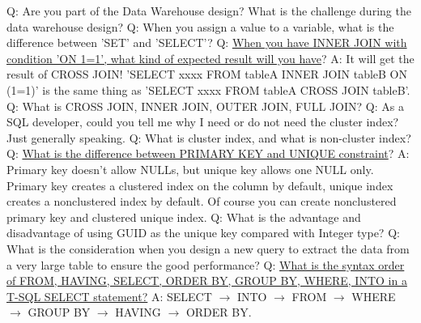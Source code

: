 \documentclass[a4paper,11pt]{article}
\begin{document}
\noindent 
Q: Are you part of the Data Warehouse design? What is the challenge during the data warehouse design?\newline \newline
\noindent 
Q: When you assign a value to a variable, what is the difference between 'SET' and 'SELECT'? \newline \newline
\noindent 
Q: \ul{When you have INNER JOIN with condition 'ON 1=1', what kind of expected result will you have}? \newline 
A: It will get the result of CROSS JOIN! 'SELECT xxxx FROM tableA INNER JOIN tableB ON (1=1)' is the same thing as 'SELECT xxxx FROM tableA CROSS JOIN tableB'. \newline \newline
\noindent 
Q: What is CROSS JOIN, INNER JOIN, OUTER JOIN, FULL JOIN? \newline \newline
\noindent 
Q: As a SQL developer, could you tell me why I need or do not need the cluster index? Just generally speaking.\newline \newline
\noindent 
Q: What is cluster index, and what is non-cluster index?\newline \newline
\noindent 
Q: \ul{What is the difference between PRIMARY KEY and UNIQUE constraint}?\newline
A: Primary key doesn't allow NULLs, but unique key allows one NULL only. Primary key creates a clustered index on the column by default, unique index creates a nonclustered index by default. Of course you can create nonclustered primary key and clustered unique index.\newline\newline
\noindent 
Q: What is the advantage and disadvantage of using GUID as the unique key compared with Integer type? \newline \newline
\noindent 
Q: What is the consideration when you design a new query to extract the data from a very large table to ensure the good performance? \newline \newline
\noindent 
Q: \ul{What is the syntax order of FROM, HAVING, SELECT, ORDER BY, GROUP BY, WHERE, INTO in a T-SQL SELECT statement?} \newline
A: SELECT $\rightarrow$ INTO $\rightarrow$ FROM $\rightarrow$ WHERE $\rightarrow$ GROUP BY $\rightarrow$ HAVING $\rightarrow$ ORDER BY. \newline \newline
\end{document}
